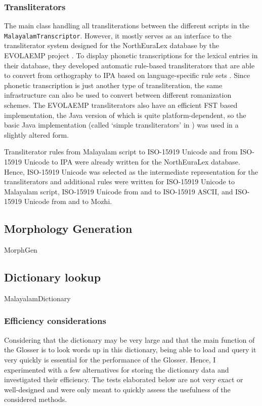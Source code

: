 \documentclass[a4paper]{article}
\newcommand{\typ}[1]{\texttt{#1}}
\begin{document}
\subsubsection{Transliterators}

The main class handling all transliterations between the different scripts in the \typ{MalayalamTranscriptor}. However, it mostly serves as an interface to the transliterator system designed for the NorthEuraLex database by the EVOLAEMP project \parencite{northeuralex}. To display phonetic transcriptions for the lexical entries in their database, they developed automatic rule-based transliterators that are able to convert from orthography to IPA based on language-specific rule sets \parencite{daneyko2016translit}. Since phonetic transcription is just another type of transliteration, the same infrastructure can also be used to convert between different romanization schemes. The EVOLAEMP transliterators also have an efficient FST based implementation, the Java version of which is quite platform-dependent, so the basic Java implementation (called `simple transliterators' in \textcite{daneyko2016translit}) was used in a slightly altered form.

Transliterator rules from Malayalam script to ISO-15919 Unicode and from ISO-15919 Unicode to IPA were already written for the NorthEuraLex database. Hence, ISO-15919 Unicode was selected as the intermediate representation for the transliterators and additional rules were written for ISO-15919 Unicode to Malayalam script, ISO-15919 Unicode from and to ISO-15919 ASCII, and ISO-15919 Unicode from and to Mozhi.

\subsection{Morphology Generation}

MorphGen

\subsection{Dictionary lookup}

MalayalamDictionary

\subsubsection{Efficiency considerations}

Considering that the dictionary may be very large and that the main function of the Glosser is to look words up in this dictionary, being able to load and query it very quickly is essential for the performance of the Glosser. Hence, I experimented with a few alternatives for storing the dictionary data and investigated their efficiency. The tests elaborated below are not very exact or well-designed and were only meant to quickly assess the usefulness of the considered methods.
\end{document}

